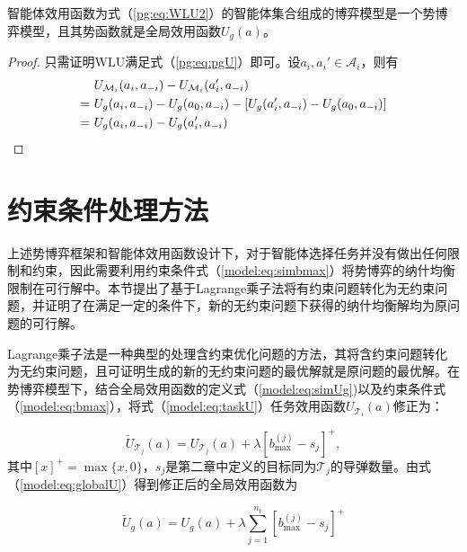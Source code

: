 \begin{proposition}[WLU可行性]
\label{pg:pro:mwlu}
	智能体效用函数为式（\ref{pg:eq:WLU2}）的智能体集合组成的博弈模型是一个势博弈模型，且其势函数就是全局效用函数$U_g(a)$。
	
	\begin{proof}
	只需证明WLU满足式（\ref{pg:eq:pgU}）即可。设$a_i,a_i' \in \mathcal{A}_i$，则有
	\begin{align}
		&\ U_{\mathcal{M}_i}(a_i,a_{-i}) - U_{\mathcal{M}_i}(a_i',a_{-i})\notag\\
		=&\ U_g(a_i,a_{-i}) - U_g(a_0,a_{-i}) - [U_g(a_i',a_{-i}) - U_g(a_0,a_{-i})]\notag\\
		=&\ U_g(a_i,a_{-i}) - U_g(a_i',a_{-i}) \notag
	\end{align}
	\end{proof}
\end{proposition}



\section{约束条件处理方法}
\label{pg:mwlu}

上述势博弈框架和智能体效用函数设计下，对于智能体选择任务并没有做出任何限制和约束，因此需要利用约束条件式（\ref{model:eq:simbmax}）将势博弈的纳什均衡限制在可行解中。本节提出了基于Lagrange乘子法将有约束问题转化为无约束问题，并证明了在满足一定的条件下，新的无约束问题下获得的纳什均衡解均为原问题的可行解。

Lagrange乘子法是一种典型的处理含约束优化问题的方法，其将含约束问题转化为无约束问题，且可证明生成的新的无约束问题的最优解就是原问题的最优解。在势博弈模型下，结合全局效用函数的定义式（\ref{model:eq:simUg})以及约束条件式（\ref{model:eq:bmax}），将式（\ref{model:eq:taskU}）任务效用函数$U_{\mathcal{T}_i}(a)$修正为：

\begin{equation}
\label{pg:eq:newTaskU}
	\widetilde U_{\mathcal{T}_j}(a) = U_{\mathcal{T}_j}(a) + \lambda [b_{\text{max}}^{(j)} - s_j]^+,
\end{equation}
其中$[x]^+=\max\{x,0\}$，$s_j$是第二章中定义的目标同为$\mathcal{T}_j$的导弹数量。由式（\ref{model:eq:globalU}）得到修正后的全局效用函数为

\begin{equation}
\label{pg:eq:newglobalU}
		\widetilde U_g(a) = U_g(a) +  \lambda \sum_{j=1}^{n_t}[b_{\text{max}}^{(j)} - s_j]^+
	\end{equation}

